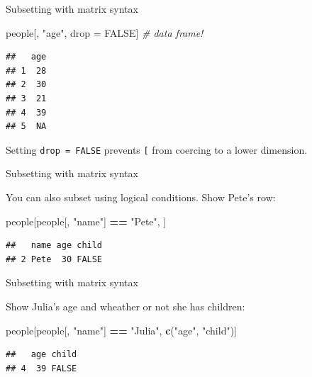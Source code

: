 \documentclass[ignorenonframetext,]{beamer}
\newenvironment{Shaded}{\begin{snugshade}}{\end{snugshade}}
\newcommand{\CommentTok}[1]{\textcolor[rgb]{0.56,0.35,0.01}{\textit{#1}}}
\newcommand{\KeywordTok}[1]{\textcolor[rgb]{0.13,0.29,0.53}{\textbf{#1}}}
\newcommand{\NormalTok}[1]{#1}
\newcommand{\OperatorTok}[1]{\textcolor[rgb]{0.81,0.36,0.00}{\textbf{#1}}}
\newcommand{\OtherTok}[1]{\textcolor[rgb]{0.56,0.35,0.01}{#1}}
\newcommand{\StringTok}[1]{\textcolor[rgb]{0.31,0.60,0.02}{#1}}
\begin{document}
\begin{frame}[fragile]{Subsetting with matrix syntax}
\protect\hypertarget{subsetting-with-matrix-syntax-3}{}

\begin{Shaded}
\begin{Highlighting}[]
\NormalTok{people[, }\StringTok{"age"}\NormalTok{, drop =}\StringTok{ }\OtherTok{FALSE}\NormalTok{] }\CommentTok{# data frame!}
\end{Highlighting}
\end{Shaded}

\begin{verbatim}
##   age
## 1  28
## 2  30
## 3  21
## 4  39
## 5  NA
\end{verbatim}

Setting \texttt{drop\ =\ FALSE} prevents \texttt{{[}} from coercing to a
lower dimension.

\end{frame}

\begin{frame}[fragile]{Subsetting with matrix syntax}
\protect\hypertarget{subsetting-with-matrix-syntax-4}{}

You can also subset using logical conditions. Show Pete's row:

\begin{Shaded}
\begin{Highlighting}[]
\NormalTok{people[people[, }\StringTok{"name"}\NormalTok{] }\OperatorTok{==}\StringTok{ "Pete"}\NormalTok{, ]}
\end{Highlighting}
\end{Shaded}

\begin{verbatim}
##   name age child
## 2 Pete  30 FALSE
\end{verbatim}

\end{frame}

\begin{frame}[fragile]{Subsetting with matrix syntax}
\protect\hypertarget{subsetting-with-matrix-syntax-5}{}

Show Julia's age and wheather or not she has children:

\begin{Shaded}
\begin{Highlighting}[]
\NormalTok{people[people[, }\StringTok{"name"}\NormalTok{] }\OperatorTok{==}\StringTok{ "Julia"}\NormalTok{, }\KeywordTok{c}\NormalTok{(}\StringTok{"age"}\NormalTok{, }\StringTok{"child"}\NormalTok{)]}
\end{Highlighting}
\end{Shaded}

\begin{verbatim}
##   age child
## 4  39 FALSE
\end{verbatim}

\end{frame}
\end{document}
